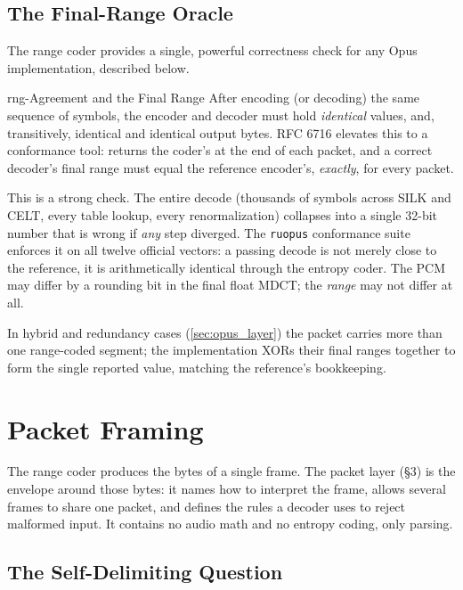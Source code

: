 \subsection{The Final-Range Oracle}\label{subsec:oracle}

The range coder provides a single, powerful correctness check for any Opus
implementation, described below.

\begin{concept}{rng-Agreement and the Final Range}
  After encoding (or decoding) the same sequence of symbols, the encoder and
  decoder must hold \emph{identical}  values, and, transitively,
  identical  and identical output bytes. RFC 6716 elevates this to a
  conformance tool:  returns the
  coder's 
  at the end of each packet, and a correct decoder's final range must equal the
  reference encoder's, \emph{exactly}, for every packet.

  This is a strong check. The entire decode (thousands of symbols across SILK
  and CELT, every table lookup, every renormalization) collapses into a single
  32-bit number that is wrong if \emph{any} step diverged. The
  \texttt{ruopus} conformance suite enforces it on all twelve official
  vectors: a passing decode is not merely close to the reference, it is
  arithmetically identical through the entropy coder. The PCM may differ by a
  rounding bit in the final float MDCT; the \emph{range} may not differ at all.
\end{concept}

In hybrid and redundancy cases (\cref{sec:opus_layer}) the packet carries more
than one range-coded segment; the implementation XORs their final ranges
together to form the single reported value, matching the reference's
bookkeeping.

\section{Packet Framing}\label{sec:packet}

The range coder produces the bytes of a single frame. The packet layer
(\S3) is the envelope around those bytes: it names how to interpret the frame,
allows several frames to share one packet, and defines the rules a decoder uses
to reject malformed input. It contains no audio math and no entropy coding, only
parsing.

\subsection{The Self-Delimiting Question}\label{subsec:self_delimit}

